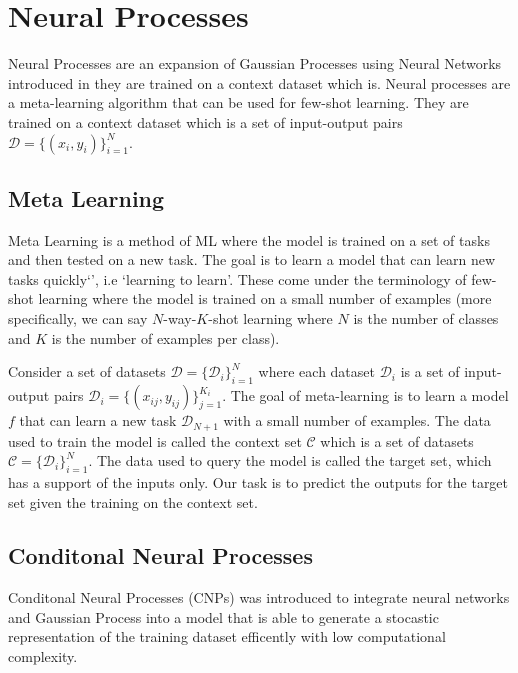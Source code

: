 \documentclass[main.tex]{subfiles}
\begin{document}
\section{Neural Processes}

Neural Processes are an expansion of Gaussian Processes using Neural Networks introduced in \cite{garnelo2018neural} they are trained on a context dataset which is. Neural processes are a meta-learning algorithm that can be used for few-shot learning. They are trained on a context dataset which is a set of input-output pairs $\mathcal{D} = \{ (x_i, y_i) \}_{i=1}^N$. 

\subsection{Meta Learning}

Meta Learning is a method of ML where the model is trained on a set of tasks and then tested on a new task. The goal is to learn a model that can learn new tasks quickly`', i.e `learning to learn'. These come under the terminology of few-shot learning where the model is trained on a small number of examples (more specifically, we can say $N$-way-$K$-shot learning where $N$ is the number of classes and $K$ is the number of examples per class).

Consider a set of datasets $\mathcal{D} = \{ \mathcal{D}_i \}_{i=1}^N$ where each dataset $\mathcal{D}_i$ is a set of input-output pairs $\mathcal{D}_i = \{ (x_{ij}, y_{ij}) \}_{j=1}^{K_i}$. The goal of meta-learning is to learn a model $f$ that can learn a new task $\mathcal{D}_{N+1}$ with a small number of examples. The data used to train the model is called the context set $\mathcal{C}$ which is a set of datasets $\mathcal{C} = \{ \mathcal{D}_i \}_{i=1}^N$. The data used to query the model is called the target set, which has a support of the inputs only. Our task is to predict the outputs for the target set given the training on the context set.

\subsection{Conditonal Neural Processes}

Conditonal Neural Processes (CNPs) \cite{garnelo2018conditional} was introduced to integrate neural networks and Gaussian Process into a model that is able to generate a stocastic representation of the training dataset efficently with low computational complexity. 


\ifSubfilesClassLoaded{%
    \printbibliography{}
}{} 
\end{document}
